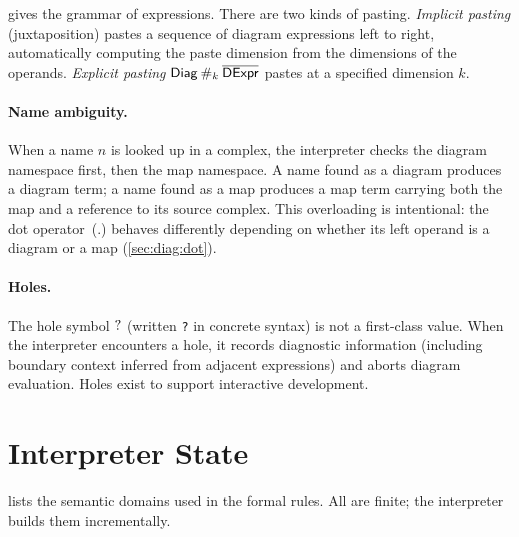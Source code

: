\documentclass[acmsmall,screen,nonacm]{acmart}
\begin{document}
 gives the grammar of expressions. There are two
kinds of pasting. \emph{Implicit pasting} (juxtaposition) pastes a
sequence of diagram expressions left to right, automatically computing the
paste dimension from the dimensions of the operands. \emph{Explicit
pasting} $\textsf{Diag} \mathbin{\#_{k}} \overline{\textsf{DExpr}}$ pastes at a specified
dimension $k$.

\paragraph{Name ambiguity.}
When a name $n$ is looked up in a complex, the interpreter checks the
diagram namespace first, then the map namespace. A name found as a diagram
produces a diagram term; a name found as a map produces a map term
carrying both the map and a reference to its source complex. This
overloading is intentional: the dot operator~(.) behaves differently
depending on whether its left operand is a diagram or a map
(\cref{sec:diag:dot}).

\paragraph{Holes.}
The hole symbol $\mathsf{?}$ (written \texttt{?} in concrete syntax) is not
a first-class value. When the interpreter encounters a hole, it records
diagnostic information (including boundary context inferred from adjacent
expressions) and aborts diagram evaluation. Holes exist to support
interactive development.

\section{Interpreter State}
\label{sec:state}

 lists the semantic domains used in the formal
rules.  All are finite; the interpreter builds them incrementally.
\end{document}
